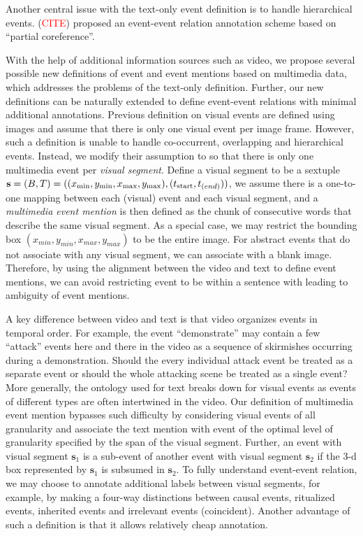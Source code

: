 \documentclass[11pt,a4paper]{article}
\newcommand{\bs}{\mathbf{s}}
\begin{document}
Another central issue with the text-only event definition is to handle hierarchical events. (\textcolor{red}{CITE}) proposed an event-event relation annotation scheme based on ``partial coreference''. 

With the help of additional information sources such as video, we propose several possible new definitions of event and event mentions based on multimedia data, which addresses the problems of the text-only definition. Further, our new definitions can be naturally extended to define event-event relations with minimal additional annotations. 
Previous definition on visual events are defined using images \cite{Li2020-crossmedia-ie} and assume that there is only one visual event per image frame. However, such a definition is unable to handle co-occurrent, overlapping and hierarchical events. Instead, we modify their assumption to so that there is only one multimedia event per \textit{visual segment}. Define a visual segment to be a sextuple $\bs = (B, T) = ((x_{\text{min}}, y_{\text{min}}, x_{\text{max}}, y_{\text{max}}), (t_{\text{start}}, t_{\text(end)}))$, we assume there is a one-to-one mapping between each (visual) event and each visual segment, and a \textit{multimedia event mention} is then defined as the chunk of consecutive words that describe the same visual segment. As a special case, we may restrict the bounding box $(x_{min}, y_{min}, x_{max}, y_{max})$ to be the entire image. For abstract events that do not associate with any visual segment, we can associate with a blank image. Therefore, by using the alignment between the video and text to define event mentions, we can avoid restricting event to be within a sentence with leading to ambiguity of event mentions.

A key difference between video and text is that video organizes events in temporal order. For example, the event ``demonstrate'' may contain a few ``attack'' events here and there in the video as a sequence of skirmishes occurring during a demonstration. Should the every individual attack event be treated as a separate event or should the whole attacking scene be treated as a single event? More generally, the ontology used for text breaks down for visual events as events of different types are often intertwined in the video. Our definition of multimedia event mention bypasses such difficulty by considering visual events of all granularity and associate the text mention with event of the optimal level of granularity specified by the span of the visual segment. Further, an event with visual segment $\bs_1$ is a sub-event of another event with visual segment $\bs_2$ if the 3-d box represented by $\bs_1$ is subsumed in $\bs_2$. To fully understand event-event relation, we may choose to annotate additional labels between visual segments, for example, by making a four-way distinctions between causal events, ritualized events, inherited events and irrelevant events (coincident). Another advantage of such a definition is that it allows relatively cheap annotation. 
\end{document}

